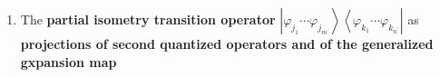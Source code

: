 \documentclass[aps,preprint]{revtex4}
\newtheorem{example}[theorem]{Example}
\begin{document}
\begin{enumerate}
\begin{example}
\begin{enumerate}
\begin{enumerate}
\item In general 
\begin{eqnarray}
\left\langle \left. \Psi _{m^{\prime }j}\right\vert a_{j_{1}}^{\dagger
}\cdots a_{j_{m}}^{\dagger }a_{k_{1}}\cdots a_{k_{n}}\Psi _{n^{\prime
}k}\right\rangle &=&L_{m^{\prime }n^{\prime }}^{mn}\left( \left\vert \Psi
_{m^{\prime }j}\right\rangle \left\langle \Psi _{m^{\prime }k}\right\vert
\right) _{j_{1}\cdots j_{m}jk_{1}\cdots k_{m}},\quad 0\leq m^{\prime }\leq
m;0\leq n^{\prime }\leq n \\
\left\langle \left. \Psi _{m^{\prime }j}\right\vert a_{j_{1}}^{\dagger
}\cdots a_{j_{m}}^{\dagger }a_{k_{1}}\cdots a_{k_{m}}\Psi _{m^{\prime
}k}\right\rangle &=&L_{m^{\prime }n^{\prime }}^{mn}\left( \left\vert \Psi
_{m^{\prime }j}\right\rangle \left\langle \Psi _{m^{\prime }k}\right\vert
\right) _{j_{1}\cdots j_{m}jk_{1}\cdots k_{m}}=0,\quad m^{\prime }+1\leq
m\leq r,0\leq n^{\prime }\leq n
\end{eqnarray}

\item \textbf{The reduced }$\left( m,n\right) $-\textbf{order} \textbf{%
transition densities }$D_{m^{\prime }n\prime }^{mn}\left( jk\right) $\textbf{%
\ are defined as} 
\begin{equation*}
D_{m^{\prime }n\prime }^{mn}\left( jk\right) =L_{m^{\prime }n^{\prime
}}^{mn}\left( \left\vert \Psi _{m^{\prime }j}\right\rangle \left\langle \Psi
_{n^{\prime }k}\right\vert \right) ,\quad 1\leq j\leq \binom{m^{\prime }}{m}%
,1\leq k\leq \binom{n^{\prime }}{n},\,0\leq m\leq m^{\prime }\leq r,\,0\leq
n\leq n^{\prime }\leq r\,.
\end{equation*}
\end{enumerate}
\end{enumerate}
\end{example}

\item The \textbf{partial isometry transition operator }$\left\vert \varphi
_{j_{1}}\cdots \varphi _{j_{m^{\prime }}}\right\rangle \left\langle \varphi
_{k_{1}}\cdots \varphi _{k_{n^{\prime }}}\right\vert $ as \textbf{%
projections of second quantized operators and of the generalized gxpansion
map}


\end{enumerate}
\end{document}
